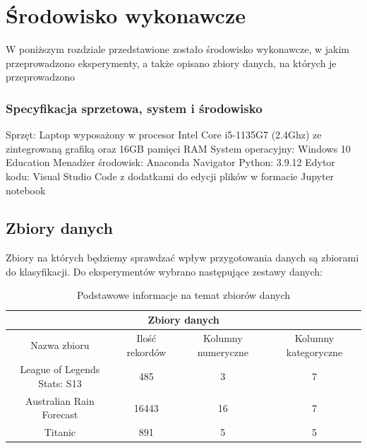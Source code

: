 \documentclass{book}
\begin{document}
\chapter{Środowisko wykonawcze}

W poniższym rozdziale przedstawione zostało środowisko wykonawcze, 
w jakim przeprowadzono eksperymenty, a także opisano zbiory danych, 
na których je przeprowadzono
\subsection*{Specyfikacja sprzetowa, system i środowisko}
Sprzęt: Laptop wyposażony w procesor Intel Core i5-1135G7 
(2.4Ghz) ze zintegrowaną grafiką oraz 16GB pamięci RAM
System operacyjny: Windows 10 Education
Menadżer środowisk: Anaconda Navigator
Python: 3.9.12
Edytor kodu: Visual Studio Code z dodatkami do edycji plików w 
formacie Jupyter notebook
\section{Zbiory danych}
Zbiory na których będziemy sprawdzać wpływ przygotowania danych 
są zbiorami do klasyfikacji. Do eksperymentów wybrano następujące 
zestawy danych:

\begin{center}
    \begin{table}[H]
    \begin{tabular}{ |c|c|c|c| } 
    \hline
    \multicolumn{4}{|c|}{Zbiory danych} \\
    \hline
    Nazwa zbioru & Ilość rekordów & Kolumny numeryczne & Kolumny kategoryczne \\
     \hline
     League of Legends Stats: S13\cite{lol_stats_dataset} & 485 & 3 & 7\\ 
     Australian Rain Forecast\cite{australian_rain_dataset} & 16443 & 16 & 7\\ 
     Titanic\cite{titanic_dataset} & 891 & 5 & 5\\ 
     \hline
     
    \end{tabular}
    \caption{Podstawowe informacje na temat zbiorów danych}
\end{table}
    \end{center}
\end{document}

